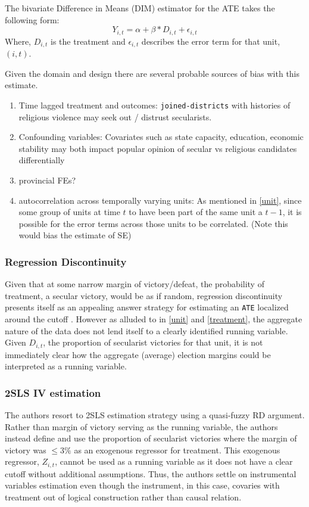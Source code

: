 \documentclass{scrartcl}
\begin{document}
The bivariate Difference in Means (DIM) estimator for the ATE takes the following form: 
\begin{equation} \label{eq:1}
  Y_{i,t} = \alpha + \beta * D_{i,t} + \epsilon_{i,t}
\end{equation}
Where, $D_{i,t}$ is the treatment and $\epsilon_{i,t}$ describes the error term for that unit, $(i,t)$.

Given the domain and design there are several probable sources of bias with this estimate.

\begin{enumerate}
\item  Time lagged treatment and outcomes: \texttt{joined-districts} with histories of religious violence may seek out / distrust secularists. 
\item Confounding variables: Covariates such as state capacity, education, economic stability may both impact popular opinion of secular vs religious candidates differentially
\item provincial FEs?
\item autocorrelation across temporally varying units: As mentioned in \ref{unit}, since some group of units at time $t$ to have been part of the same unit a $t-1$, it is possible for the error terms across those units to be correlated. (Note this would bias the estimate of SE)
\end{enumerate}

\subsubsection{Regression Discontinuity}
Given that at some narrow margin of victory/defeat, the probability of treatment, a secular victory, would be as if random, regression discontinuity presents itself as an appealing answer strategy for estimating an \texttt{ATE} localized around the cutoff \cite{Cattaneo_2019}. 
However as alluded to in \ref{unit} and \ref{treatment}, the aggregate nature of the data does not lend itself to a clearly identified running variable.
Given $D_{i,t}$, the proportion of secularist victories for that unit, it is not immediately clear how the aggregate (average) election margins could be interpreted as a running variable. 

\subsubsection{2SLS IV estimation} \label{iv}

The authors resort to 2SLS estimation strategy using a quasi-fuzzy RD argument.
Rather than margin of victory serving as the running variable, the authors instead define and use the proportion of secularist victories where the margin of victory was $ \leq 3\%$ as an exogenous regressor for treatment.
This exogenous regressor, $Z_{i,t}$, cannot be used as a running variable as it does not have a clear cutoff without additional assumptions.
Thus, the authors settle on instrumental variables estimation even though the instrument, in this case, covaries with treatment out of logical construction rather than causal relation.
\end{document}
